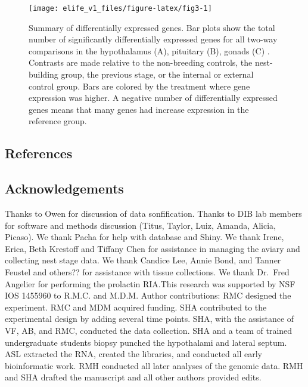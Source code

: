 \begin{Schunk}
\begin{figure}
\texttt{[image: elife\_v1\_files/figure-latex/fig3-1]} \caption[Summary of differentially expressed genes]{Summary of differentially expressed genes. Bar plots show the total number of significantly differentially expressed genes for all two-way comparisons in the hypothalamus (A), pituitary (B), gonads (C) . Contrasts are made relative to the non-breeding controls, the nest-building group, the previous stage, or the internal or external control group. Bars are colored by the treatment where gene expression was higher. A negative number of differentially expressed genes means that many genes had increase expression in the reference group.}\label{fig:fig3}
\end{figure}
\end{Schunk}

\newpage

\hypertarget{references}{%
\subsection{References}\label{references}}



\hypertarget{acknowledgements}{%
\subsection{Acknowledgements}\label{acknowledgements}}

Thanks to Owen for discussion of data sonfification. Thanks to DIB lab
members for software and methods discussion (Titus, Taylor, Luiz,
Amanda, Alicia, Picaso). We thank Pacha for help with database and
Shiny. We thank Irene, Erica, Beth Krestoff and Tiffany Chen for
assistance in managing the aviary and collecting nest stage data. We
thank Candice Lee, Annie Bond, and Tanner Feustel and others?? for
assistance with tissue collections. We thank Dr.~Fred Angelier for
performing the prolactin RIA.This research was supported by NSF IOS
1455960 to R.M.C. and M.D.M. Author contributions: RMC designed the
experiment. RMC and MDM acquired funding. SHA contributed to the
experimental design by adding several time points. SHA, with the
assistance of VF, AB, and RMC, conducted the data collection. SHA and a
team of trained undergraduate students biopsy punched the hypothalami
and lateral septum. ASL extracted the RNA, created the libraries, and
conducted all early bioinformatic work. RMH conducted all later analyses
of the genomic data. RMH and SHA drafted the manuscript and all other
authors provided edits.

